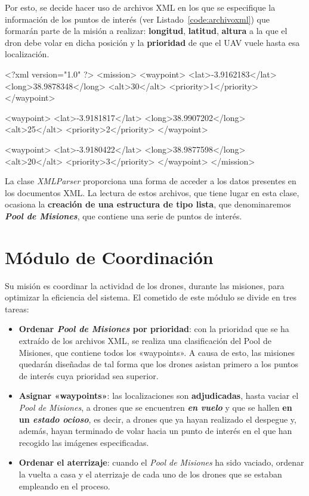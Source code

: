 Por esto, se decide hacer uso de archivos XML en los que se especifique la información de los puntos de interés (ver Listado~\ref{code:archivoxml}) que formarán parte de la misión a realizar: \textbf{longitud}, \textbf{latitud}, \textbf{altura} a la que el dron debe volar en dicha posición y la \textbf{prioridad} de que el \acs{UAV} vuele hasta esa localización. 

\begin{listing}[
 float=,
 language = XML,
 caption = {Ejemplo de archivo XML que contiene la información de los «waypoints»},
 label  = code:archivoxml]
<?xml version="1.0" ?>
<mission>
	<waypoint>
 		<lat>-3.9162183</lat>
 		<long>38.9878348</long>
		<alt>30</alt>
		<priority>1</priority>
	</waypoint>

	<waypoint>
 		<lat>-3.9181817</lat>
 		<long>38.9907202</long>
		<alt>25</alt>
		<priority>2</priority>
	</waypoint>

	<waypoint>
 		<lat>-3.9180422</lat>
 		<long>38.9877598</long>
		<alt>20</alt>
		<priority>3</priority>
	</waypoint>
</mission>
\end{listing}

La clase \textit{XMLParser} proporciona una forma de acceder a los datos presentes en los documentos XML. La lectura de estos archivos, que tiene lugar en esta clase, ocasiona la \textbf{creación de una estructura de tipo lista}, que denominaremos \textbf{\textit{Pool de Misiones}}, que contiene una serie de puntos de interés.

\section{Módulo de Coordinación}

Su misión es coordinar la actividad de los drones, durante las misiones, para optimizar la eficiencia del sistema. El cometido de este módulo se divide en tres tareas:

\begin{itemize}
\item \textbf{Ordenar \textit{Pool de Misiones} por prioridad}: con la prioridad que se ha extraído de los archivos XML, se realiza una clasificación del Pool de Misiones, que contiene todos los «waypoints». A causa de esto, las misiones quedarán diseñadas de tal forma que los drones asistan primero a los puntos de interés cuya prioridad sea superior.
\item \textbf{Asignar «waypoints»}: las localizaciones son \textbf{adjudicadas}, hasta vaciar el \textit{Pool de Misiones}, a drones que se encuentren \textbf{\textit{en vuelo}} y que se hallen \textbf{en un \textit{estado ocioso}}, es decir, a drones que ya hayan realizado el despegue y, además, hayan terminado de volar hacia un punto de interés en el que han recogido las imágenes especificadas. 
\item \textbf{Ordenar el aterrizaje}: cuando el \textit{Pool de Misiones} ha sido vaciado, ordenar la vuelta a casa y el aterrizaje de cada uno de los drones que se estaban empleando en el proceso.
\end{itemize}

